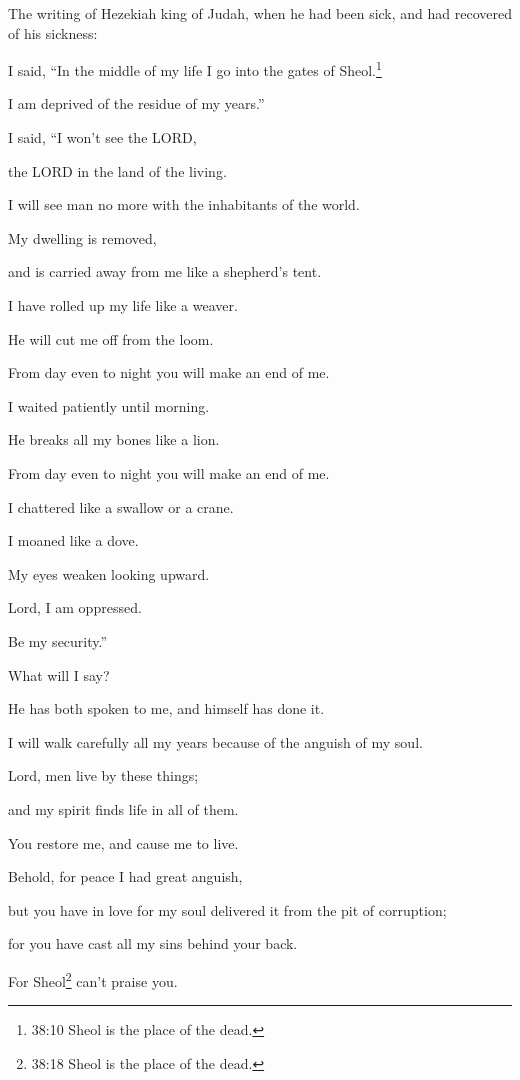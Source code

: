 \myverse{}The writing of Hezekiah king of Judah, when he had been sick,
and had recovered of his sickness:

\myverse{}I said, “In the middle of my life I go into the gates of Sheol.\footnote{38:10 Sheol is the place of the dead.}

I am deprived of the residue of my years.”

\myverse{}I said, “I won’t see the LORD,

the LORD in the land of the living.

I will see man no more with the inhabitants of the world.

\myverse{}My dwelling is removed,

and is carried away from me like a shepherd’s tent.

I have rolled up my life like a weaver.

He will cut me off from the loom.

From day even to night you will make an end of me.

\myverse{}I waited patiently until morning.

He breaks all my bones like a lion.

From day even to night you will make an end of me.

\myverse{}I chattered like a swallow or a crane.

I moaned like a dove.

My eyes weaken looking upward.

Lord, I am oppressed.

Be my security.”

\myverse{}What will I say?

He has both spoken to me, and himself has done it.

I will walk carefully all my years because of the anguish of my soul.

\myverse{}Lord, men live by these things;

and my spirit finds life in all of them.

You restore me, and cause me to live.

\myverse{}Behold, for peace I had great anguish,

but you have in love for my soul delivered it from the pit of corruption;

for you have cast all my sins behind your back.

\myverse{}For Sheol\footnote{38:18 Sheol is the place of the dead.} can’t praise you.

